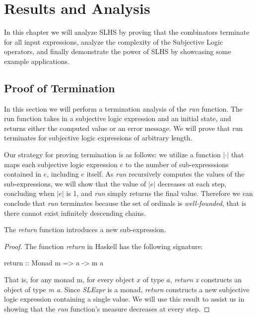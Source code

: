 \documentclass[thesis.tex]{subfiles}
\begin{document}
\chapter{Results and Analysis}
\label{chap:results-and-analysis}

In this chapter we will analyze SLHS by proving that the combinators terminate for
all input expressions, analyze the complexity of the Subjective Logic operators, and
finally demonstrate the power of SLHS by showcasing some example applications.





\section{Proof of Termination}

In this section we will perform a termination analysis of the \emph{run} function. The
run function takes in a subjective logic expression and an initial state, and returns
either the computed value or an error message. We will prove that run terminates for
subjective logic expressions of arbitrary length.

Our strategy for proving termination is as follows: we utilize a function $|\cdot|$ that
maps each subjective logic expression $e$ to the number of sub-expresssions contained in
$e$, including $e$ itself. As \emph{run} recursively computes the values of the
sub-expressions, we will show that the value of $|e|$ decreases at each step, concluding
when $|e|$ is 1, and \emph{run} simply returns the final value. Therefore we can conclude
that \emph{run} terminates because the set of ordinals is \emph{well-founded}, that is there
cannot exist infinitely descending chains.

\begin{lemma}
  The \emph{return} function introduces a new sub-expression.
\end{lemma}

\begin{proof}
  The function \emph{return} in Haskell has the following signature:

  \begin{spec}
    return :: Monad m => a -> m a
  \end{spec}

  That is, for any monad m, for every object $x$ of type $a$, \emph{return x} constructs
  an object of type \emph{m a}. Since \emph{SLExpr} is a monad, \emph{return} constructs
  a new subjective logic expression containing a single value. We will use this result to
  assist us in showing that the \emph{run} function's measure decreases at every step.
\end{proof}
\end{document}
